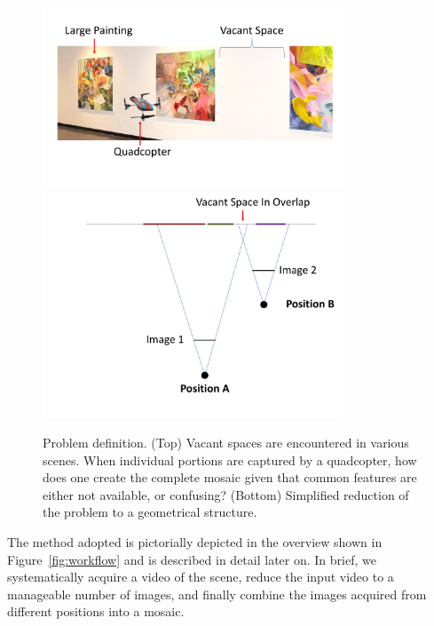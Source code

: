 \begin{figure}[h!]
  \centering
  \includegraphics[width=0.8\textwidth]{figures/indoor}\\
  \includegraphics[width=0.8\textwidth]{figures/stereoOverlap}\\

  \caption[Problem definition]{ \label{fig:schematic} Problem definition. (Top)
  Vacant spaces are encountered in various scenes.  When individual portions are
    captured by a quadcopter, how does one create the complete mosaic
    given that common features are either not available, or
    confusing? (Bottom) Simplified reduction of the problem to a geometrical structure.
  }
\end{figure}    

The method adopted is pictorially depicted in the overview shown in
Figure~\ref{fig:workflow} and is described in detail later on.  In
brief, we systematically acquire a video of the scene, reduce the
input video to a manageable number of images, and finally combine the
images acquired from different positions into a mosaic.

